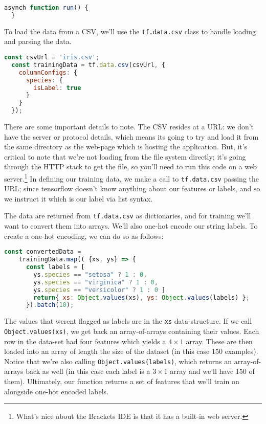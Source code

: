 \documentclass[12pt]{article}
\begin{document}
\begin{lstlisting}[language=JavaScript]
  asynch function run() { 
  }
\end{lstlisting}

To load the data from a CSV, we'll use the \texttt{tf.data.csv} class to handle loading and parsing the data.
\begin{lstlisting}[language=JavaScript]
  const csvUrl = 'iris.csv';
  const trainingData = tf.data.csv(csvUrl, {
    columnConfigs: {
      species: {
        isLabel: true
      }
    }
  });
\end{lstlisting}

There are some important details to note. The CSV resides at a URL: we don't have the server or protocol details, which means its going to try and load it from the same directory as the web-page which is hosting the application. But, it's critical to note that we're not loading from the file system directly; it's going through the HTTP stack to get the file, so you'll need to run this code on a web server.\footnote{What's nice about the Brackets IDE is that it has a built-in web server.} In defining our training data, we make a call to \texttt{tf.data.csv} passing the URL; since tensorflow doesn't know anything about our features or labels, and so we instruct it which is our label via list syntax.

The data are returned from \texttt{tf.data.csv} as dictionaries, and for training we'll want to convert them into arrays. We'll also one-hot encode our string labels. To create a one-hot encoding, we can do so as follows:

\begin{lstlisting}[language=JavaScript]
  const convertedData =
    trainingData.map(( {xs, ys} => {
      const labels = [
        ys.species == "setosa" ? 1 : 0,
        ys.species == "virginica" ? 1 : 0,
        ys.species == "versicolor" ? 1 : 0 ]
        return{ xs: Object.values(xs), ys: Object.values(labels) };
      }).batch(10);
\end{lstlisting}
The values that werent flagged as labels are in the \texttt{xs} data-structure. If we call \texttt{Object.values(xs)}, we get back an array-of-arrays containing their values. Each row in the data-set had four features which yields a $4 \times 1$ array. These are then loaded into an array of length the size of the dataset (in this case 150 examples). Notice that we're also calling \texttt{Object.values(labels)}, which returns an array-of-arrays back as well (in this case each label is a $3 \times 1$ array and we'll have 150 of them). Ultimately, our function returns a set of features that we'll train on alongside one-hot encoded labels.
\end{document}
